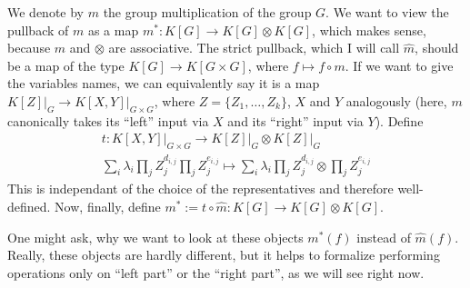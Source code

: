 We denote by $m$ the group multiplication of the group $G$.
We want to view the pullback of $m$ as a map $m^\ast : K[G] \longrightarrow K[G] \otimes K[G]$, which makes sense, because $m$ and $\otimes$ are associative.
The strict pullback, which I will call $ \hat{m} $, should be a map of the type $ K[G] \longrightarrow K[ G \times G] $, where $ f \mapsto f \circ m $.
If we want to give the variables names, we can equivalently say it is a map $ \left. K[Z] \right|_G \longrightarrow \left. K[X,Y] \right|_{G \times G} $, where $ Z = \lbrace Z_1 , \ldots , Z_k \rbrace $, $X$ and $Y$ analogously (here, $ m $ canonically takes its ``left'' input via $ X $ and its ``right'' input via $ Y $). Define
\begin{equation}
  \begin{aligned}
   t : \left. K \left\lbrack X , Y \right\rbrack \right|_{G \times G} \longrightarrow \left. K \left\lbrack Z \right\rbrack \right|_G \otimes \left. K\left\lbrack Z \right\rbrack \right|_G \\
    \sum_i \lambda_i \prod_j Z_{j}^{d_{i,j}} \prod_j Z_{j}^{e_{i,j}} \mapsto \sum_i \lambda_i \prod_j Z_{j}^{d_{i,j}} \otimes \prod_j Z_{j}^{e_{i,j}} 
  \end{aligned}
\end{equation}
This is independant of the choice of the representatives and therefore well-defined.
Now, finally, define $m^\ast := t \circ \hat{m} : K[G] \longrightarrow K[G] \otimes K[G]$.

One might ask, why we want to look at these objects $ m^\ast \left( f \right) $ instead of $ \hat{m} \left( f \right) $.
Really, these objects are hardly different, but it helps to formalize performing operations only on ``left part'' or the ``right part'', as we will see right now.

